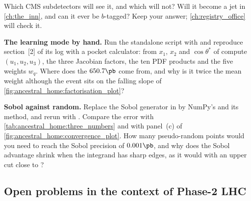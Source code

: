\begin{exercises}
  Which CMS subdetectors will see it, and which will not? Will it become a
  jet in \cref{ch:the_inn}, and can it ever be $b$-tagged? Keep your
  answer; \cref{ch:registry_office} will check it.
\item \textbf{The learning mode by hand.} Run the standalone script with
   and reproduce section~[2] of its log with a pocket calculator:
  from $x_1$, $x_2$ and $\cos\theta^*$ of  compute
  $(u_1,u_2,u_3)$, the three Jacobian factors, the ten PDF products and the
  five weights $w_q$. Where does the $650.7\pb$ come from, and why is it
  twice the mean weight although the event sits on the falling slope of
  \cref{fig:ancestral_home:factorisation_plot}?
\item \textbf{Sobol against random.} Replace the Sobol generator in
   by NumPy's  and its
   method, and rerun with . Compare the error with
  \cref{tab:ancestral_home:three_numbers} and with panel~(c) of
  \cref{fig:ancestral_home:convergence_plot}. How many pseudo-random points
  would you need to reach the Sobol precision of $0.001\pb$, and why does the
  Sobol advantage shrink when the integrand has sharp edges, as it would with
  an upper cut  close to ?
\end{exercises}

\subsection*{Open problems in the context of Phase-2 LHC}
\label{sec:ancestral_home:open_problems}


